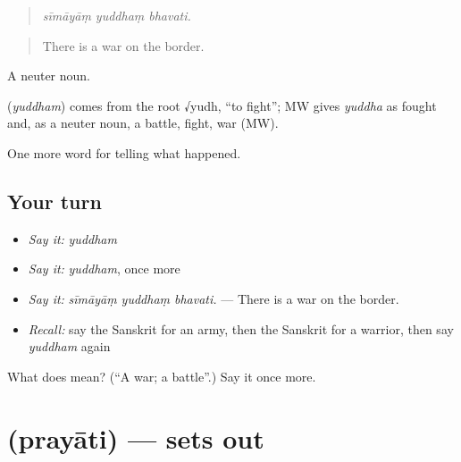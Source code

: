 \begin{quote}
  
\end{quote}

\begin{quote}
\emph{sīmāyāṃ yuddhaṃ bhavati.}
\end{quote}

\begin{quote}
There is a war on the border.
\end{quote}

A neuter noun.

\begin{cousinweb}
\textbf{} (\emph{yuddham}) comes from the root √yudh, \textquotedblleft{}to fight\textquotedblright{}; MW gives \emph{yuddha} as fought and, as a neuter noun, a battle, fight, war (MW).
\end{cousinweb}

\begin{grammarlens}[title={What you've built}]
One more word for telling what happened.
\end{grammarlens}

\subsection*{Your turn}
\begin{itemize}
\raggedright
  \item \emph{Say it:} \emph{yuddham}
  \item \emph{Say it:} \emph{yuddham}, once more
  \item \emph{Say it:} \emph{sīmāyāṃ yuddhaṃ bhavati.} — There is a war on the border.
  \item \emph{Recall:} say the Sanskrit for an army, then the Sanskrit for a warrior, then say \emph{yuddham} again
\end{itemize}

\begin{tcolorbox}[breakable,colback=teal!4,colframe=teal!35!black,title={Before you move on}]
What does  mean? (\textquotedblleft{}A war; a battle\textquotedblright{}.) Say it once more.
\end{tcolorbox}
\section[\texorpdfstring{\sk{प्रयाति} (prayāti)}{प्रयाति (prayāti)}]{ (prayāti) — sets out}

\label{lesson:SA-C318-prayati}



